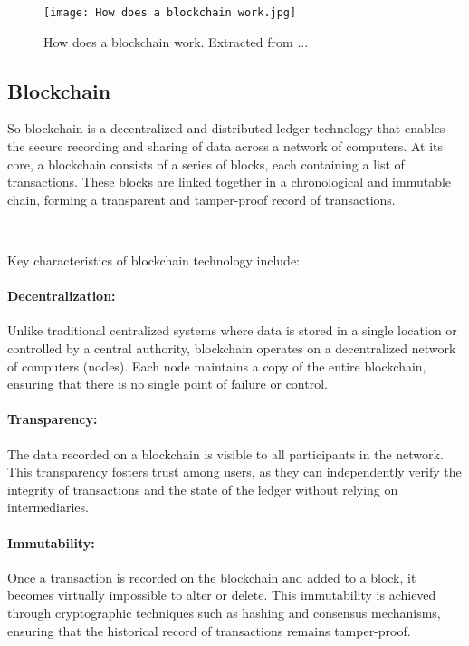 \begin{figure}[H]
    \texttt{[image: How does a blockchain work.jpg]}
    \centering
    \caption[How does a blockchain work]{How does a blockchain work. Extracted from ...}
    \label{fig:how_does_a_blockchain_work}
\end{figure}

\subsection{Blockchain}
\label{subsec:blockchain}

So blockchain is a decentralized and distributed ledger technology that enables the secure recording and sharing of data across a network of computers. At its core, a blockchain consists of a series of blocks, each containing a list of transactions. These blocks are linked together in a chronological and immutable chain, forming a transparent and tamper-proof record of transactions.

~

Key characteristics of blockchain technology include:

\paragraph{Decentralization:}
Unlike traditional centralized systems where data is stored in a single location or controlled by a central authority, blockchain operates on a decentralized network of computers (nodes). Each node maintains a copy of the entire blockchain, ensuring that there is no single point of failure or control.

\paragraph{Transparency:}
The data recorded on a blockchain is visible to all participants in the network. This transparency fosters trust among users, as they can independently verify the integrity of transactions and the state of the ledger without relying on intermediaries.

\paragraph{Immutability:}
Once a transaction is recorded on the blockchain and added to a block, it becomes virtually impossible to alter or delete. This immutability is achieved through cryptographic techniques such as hashing and consensus mechanisms, ensuring that the historical record of transactions remains tamper-proof.

